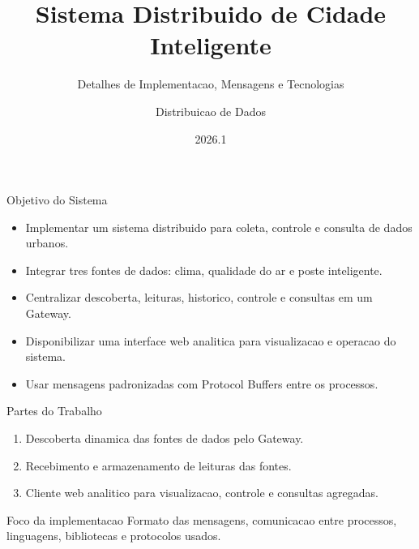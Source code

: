 \documentclass[aspectratio=169]{beamer}
\title[Sistema Distribuido de Cidade Inteligente]{Sistema Distribuido de Cidade Inteligente}
\subtitle{Detalhes de Implementacao, Mensagens e Tecnologias}
\author{Distribuicao de Dados}
\institute{Universidade Federal do Ceara}
\date{2026.1}
\begin{document}
\begin{frame}
  \titlepage
\end{frame}

\begin{frame}{Objetivo do Sistema}
  \begin{itemize}
    \item Implementar um sistema distribuido para coleta, controle e consulta de dados urbanos.
    \item Integrar tres fontes de dados: clima, qualidade do ar e poste inteligente.
    \item Centralizar descoberta, leituras, historico, controle e consultas em um Gateway.
    \item Disponibilizar uma interface web analitica para visualizacao e operacao do sistema.
    \item Usar mensagens padronizadas com Protocol Buffers entre os processos.
  \end{itemize}
\end{frame}

\begin{frame}{Partes do Trabalho}
  \begin{enumerate}
    \item Descoberta dinamica das fontes de dados pelo Gateway.
    \item Recebimento e armazenamento de leituras das fontes.
    \item Cliente web analitico para visualizacao, controle e consultas agregadas.
  \end{enumerate}

  \vspace{0.4cm}
  \begin{block}{Foco da implementacao}
    Formato das mensagens, comunicacao entre processos, linguagens, bibliotecas e protocolos usados.
  \end{block}
\end{frame}
\end{document}
